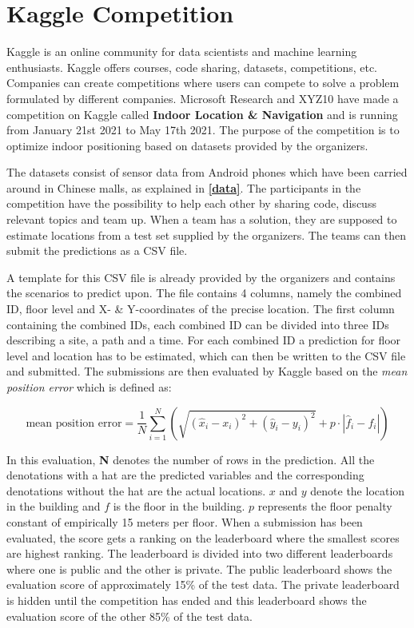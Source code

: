 \section{Kaggle Competition}
\label{sec:kaggleComp}
Kaggle is an online community for data scientists and machine learning enthusiasts. Kaggle offers courses, code sharing, datasets, competitions, etc. Companies can create competitions where users can compete to solve a problem formulated by different companies. Microsoft Research and XYZ10 have made a competition on Kaggle called \textbf{Indoor Location \& Navigation} and is running from January 21st 2021 to May 17th 2021. The purpose of the competition is to optimize indoor positioning based on datasets provided by the organizers.

The datasets consist of sensor data from Android phones which have been carried around in Chinese malls, as explained in \textbf{\autoref{data}}. The participants in the competition have the possibility to help each other by sharing code, discuss relevant topics and team up. When a team has a solution, they are supposed to estimate locations from a test set supplied by the organizers. The teams can then submit the predictions as a CSV file.

A template for this CSV file is already provided by the organizers and contains the scenarios to predict upon. The file contains 4 columns, namely the combined ID, floor level and X- \& Y-coordinates of the precise location. The first column containing the combined IDs, each combined ID can be divided into three IDs describing a site, a path and a time. For each combined ID a prediction for floor level and location has to be estimated, which can then be written to the CSV file and submitted. The submissions are then evaluated by Kaggle based on the \textit{mean position error} which is defined as:

\begin{equation} \label{eq:MeanPositionError}
\text{mean position error} = \frac{1}{N} \sum_{i=1}^{N}  
                                                \left( \sqrt{( \hat{x}_i - x_i )^{2} + ( \hat{y}_i - y_i )^{2}} 
                                                + p \cdot | \hat{f}_{i} - f_i | \right) 
\end{equation}

In this evaluation, \textbf{N} denotes the number of rows in the prediction. All the denotations with a hat are the predicted variables and the corresponding denotations without the hat are the actual locations. $x$ and $y$ denote the location in the building and $f$ is the floor in the building. $p$ represents the floor penalty constant of empirically 15 meters per floor\cite{MicrosoftConversation}. When a submission has been evaluated, the score gets a ranking on the leaderboard where the smallest scores are highest ranking. The leaderboard is divided into two different leaderboards where one is public and the other is private. The public leaderboard shows the evaluation score of approximately 15\% of the test data. The private leaderboard is hidden until the competition has ended and this leaderboard shows the evaluation score of the other 85\% of the test data.\cite{CompetitionSite}

